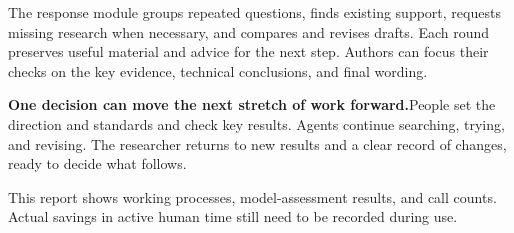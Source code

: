 The response module groups repeated questions, finds existing support, requests missing research when necessary, and compares and revises drafts. Each round preserves useful material and advice for the next step. Authors can focus their checks on the key evidence, technical conclusions, and final wording.

\begin{insight}
\textbf{One decision can move the next stretch of work forward.}\quad People set the direction and standards and check key results. Agents continue searching, trying, and revising. The researcher returns to new results and a clear record of changes, ready to decide what follows.
\end{insight}

This report shows working processes, model-assessment results, and call counts. Actual savings in active human time still need to be recorded during use.
